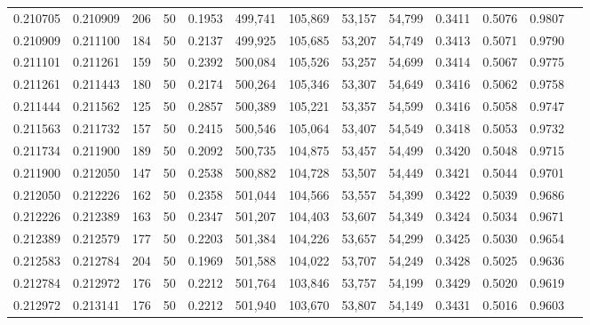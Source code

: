 \begin{tabular}{rrrrrrrrrrrrr}
0.210705 & 0.210909 &   206 &  50 &                                     0.1953 & 499,741 & 105,869 &  53,157 &  54,799 & 0.3411 & 0.5076 & 0.9807 \\
0.210909 & 0.211100 &   184 &  50 &                                     0.2137 & 499,925 & 105,685 &  53,207 &  54,749 & 0.3413 & 0.5071 & 0.9790 \\
0.211101 & 0.211261 &   159 &  50 &                                     0.2392 & 500,084 & 105,526 &  53,257 &  54,699 & 0.3414 & 0.5067 & 0.9775 \\
0.211261 & 0.211443 &   180 &  50 &                                     0.2174 & 500,264 & 105,346 &  53,307 &  54,649 & 0.3416 & 0.5062 & 0.9758 \\
0.211444 & 0.211562 &   125 &  50 &                                     0.2857 & 500,389 & 105,221 &  53,357 &  54,599 & 0.3416 & 0.5058 & 0.9747 \\
0.211563 & 0.211732 &   157 &  50 &                                     0.2415 & 500,546 & 105,064 &  53,407 &  54,549 & 0.3418 & 0.5053 & 0.9732 \\
0.211734 & 0.211900 &   189 &  50 &                                     0.2092 & 500,735 & 104,875 &  53,457 &  54,499 & 0.3420 & 0.5048 & 0.9715 \\
0.211900 & 0.212050 &   147 &  50 &                                     0.2538 & 500,882 & 104,728 &  53,507 &  54,449 & 0.3421 & 0.5044 & 0.9701 \\
0.212050 & 0.212226 &   162 &  50 &                                     0.2358 & 501,044 & 104,566 &  53,557 &  54,399 & 0.3422 & 0.5039 & 0.9686 \\
0.212226 & 0.212389 &   163 &  50 &                                     0.2347 & 501,207 & 104,403 &  53,607 &  54,349 & 0.3424 & 0.5034 & 0.9671 \\
0.212389 & 0.212579 &   177 &  50 &                                     0.2203 & 501,384 & 104,226 &  53,657 &  54,299 & 0.3425 & 0.5030 & 0.9654 \\
0.212583 & 0.212784 &   204 &  50 &                                     0.1969 & 501,588 & 104,022 &  53,707 &  54,249 & 0.3428 & 0.5025 & 0.9636 \\
0.212784 & 0.212972 &   176 &  50 &                                     0.2212 & 501,764 & 103,846 &  53,757 &  54,199 & 0.3429 & 0.5020 & 0.9619 \\
0.212972 & 0.213141 &   176 &  50 &                                     0.2212 & 501,940 & 103,670 &  53,807 &  54,149 & 0.3431 & 0.5016 & 0.9603 \\

\end{tabular}
